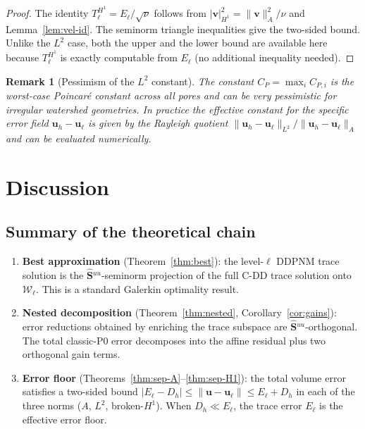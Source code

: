 \documentclass[11pt,a4paper]{article}
\newtheorem{remark}[theorem]{Remark}
\theoremstyle{definition}
\newcommand{\vel}{\bm{u}}
\newcommand{\Schur}{\mathbf{S}}
\newcommand{\Shatuu}{\widehat{\Schur}{}^{uu}}
\newcommand{\Wspace}{\mathcal{W}}
\begin{document}
\begin{proof}
  The identity $T_\ell^{H^1} = E_\ell/\sqrt{\nu}$ follows from
  $|\bm{v}|_{H^1}^2 = \|\bm{v}\|_A^2/\nu$ and Lemma~\ref{lem:vel-id}.
  The seminorm triangle inequalities give the two-sided bound.
  Unlike the $L^2$ case, both the upper and the lower bound are
  available here because $T_\ell^{H^1}$ is exactly computable
  from $E_\ell$ (no additional inequality needed).
\end{proof}

\begin{remark}[Pessimism of the $L^2$ constant]\label{rem:CP}
  The constant $C_P = \max_i C_{P,i}$ is the worst-case Poincar\'e
  constant across all pores and can be very pessimistic for irregular
  watershed geometries.  In practice the effective constant for the
  specific error field $\vel_h-\vel_\ell$ is given by the Rayleigh
  quotient $\|\vel_h-\vel_\ell\|_{L^2} / \|\vel_h-\vel_\ell\|_A$
  and can be evaluated numerically.
\end{remark}

\section{Discussion}

\subsection{Summary of the theoretical chain}

\begin{enumerate}[leftmargin=*,itemsep=4pt]
  \item \textbf{Best approximation} (Theorem~\ref{thm:best}):
    the level-$\ell$ DDPNM trace solution is the $\Shatuu$-seminorm
    projection of the full C-DD trace solution onto $\Wspace_\ell$.
    This is a standard Galerkin optimality result.
  \item \textbf{Nested decomposition} (Theorem~\ref{thm:nested},
    Corollary~\ref{cor:gains}):
    error reductions obtained by enriching the trace subspace are
    $\Shatuu$-orthogonal.  The total classic-P0 error decomposes into
    the affine residual plus two orthogonal gain terms.
  \item \textbf{Error floor} (Theorems~\ref{thm:sep-A}--\ref{thm:sep-H1}):
    the total volume error satisfies a two-sided bound
    $|E_\ell - D_h| \le \|\vel-\vel_\ell\| \le E_\ell + D_h$
    in each of the three norms ($A$, $L^2$, broken-$H^1$).
    When $D_h \ll E_\ell$, the trace error $E_\ell$ is the effective
    error floor.
\end{enumerate}
\end{document}
